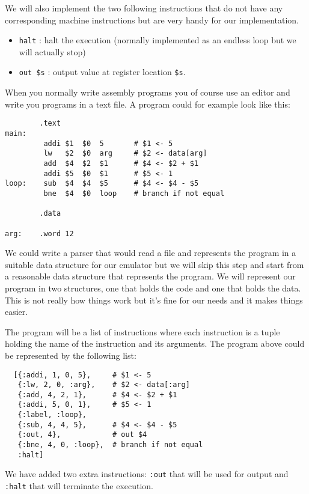 \documentclass[a4paper,11pt]{article}
\begin{document}
We will also implement the two following instructions that do not
have any corresponding machine instructions but are very handy for our
implementation.

\begin{itemize}
\item {\tt halt} : halt the execution (normally implemented as an endless loop but we will actually stop)
\item {\tt out \$s} : output value at register location {\tt \$s}.
\end{itemize}

When you normally write assembly programs you of course use an editor
and write you programs in a text file. A program could for example
look like this:

\begin{verbatim}
        .text   
main:
         addi $1  $0  5       # $1 <- 5 
         lw   $2  $0  arg     # $2 <- data[arg]
         add  $4  $2  $1      # $4 <- $2 + $1
         addi $5  $0  $1      # $5 <- 1
loop:    sub  $4  $4  $5      # $4 <- $4 - $5
         bne  $4  $0  loop    # branch if not equal

        .data

arg:    .word 12
\end{verbatim}

We could write a parser that would read a file and represents the
program in a suitable data structure for our emulator but we will skip
this step and start from a reasonable data structure that represents
the program. We will represent our program in two structures, one that
holds the code and one that holds the data. This is not really how
things work but it's fine for our needs and it makes things easier.

The program will be a list of instructions where each instruction is a
tuple holding the name of the instruction and its arguments. The
program above could be represented by the following list:

\begin{verbatim}
  [{:addi, 1, 0, 5},     # $1 <- 5 
   {:lw, 2, 0, :arg},    # $2 <- data[:arg]
   {:add, 4, 2, 1},      # $4 <- $2 + $1
   {:addi, 5, 0, 1},     # $5 <- 1
   {:label, :loop},
   {:sub, 4, 4, 5},      # $4 <- $4 - $5
   {:out, 4},            # out $4
   {:bne, 4, 0, :loop},  # branch if not equal
   :halt]
\end{verbatim}

We have added two extra instructions: {\tt :out} that will be used for
output and {\tt :halt} that will terminate the execution.
\end{document}
